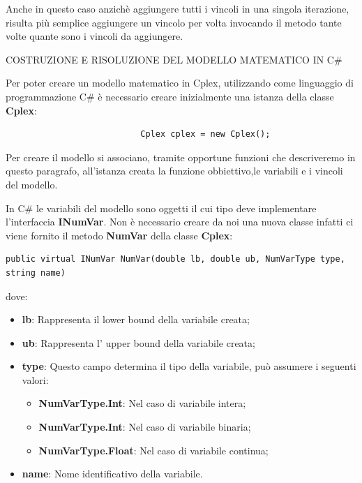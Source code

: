 \documentclass[11pt]{article}
\begin{document}
Anche in questo caso anzichè aggiungere tutti i vincoli in una singola iterazione, risulta più semplice aggiungere un vincolo per volta invocando il metodo tante volte quante sono i vincoli da aggiungere.

\vspace{2\baselineskip}
COSTRUZIONE E RISOLUZIONE DEL MODELLO MATEMATICO IN C\#
\vspace{2\baselineskip}

Per poter creare un modello matematico in Cplex, utilizzando come linguaggio di programmazione C\# è necessario creare inizialmente una istanza della classe \textbf{Cplex}:

\begin{lstlisting}
                           Cplex cplex = new Cplex();
\end{lstlisting}

Per creare il modello si associano, tramite opportune funzioni che descriveremo in questo paragrafo, all'istanza creata la funzione obbiettivo,le variabili e i vincoli del modello. 

In C\# le variabili del modello sono oggetti il cui tipo deve implementare l'interfaccia \textbf{INumVar}. Non è necessario creare da noi una nuova classe infatti ci viene fornito il metodo \textbf{NumVar} della classe \textbf{Cplex}:

\begin{lstlisting}
public virtual INumVar NumVar(double lb, double ub, NumVarType type, string name)
\end{lstlisting}

dove:

\begin{itemize}
\item \textbf{lb}: Rappresenta il lower bound della variabile creata;
\item \textbf{ub}: Rappresenta l' upper bound della variabile creata;
\item \textbf{type}: Questo campo determina il tipo della variabile, può assumere i seguenti valori:
\begin{itemize}
\item \textbf{NumVarType.Int}: Nel caso di variabile intera;
\item \textbf{NumVarType.Int}: Nel caso di variabile binaria;
\item \textbf{NumVarType.Float}: Nel caso di variabile continua;
\end{itemize}
\item \textbf{name}: Nome identificativo della variabile.
\end{itemize}
\end{document}
